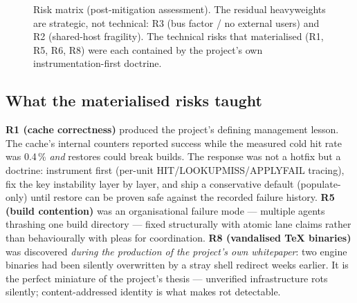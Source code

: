 \begin{figure}[h]
\centering
{}
\caption{Risk matrix (post-mitigation assessment). The residual heavyweights are strategic, not technical: R3 (bus factor / no external users) and R2 (shared-host fragility). The technical risks that materialised (R1, R5, R6, R8) were each contained by the project's own instrumentation-first doctrine.}
\label{fig:riskmatrix}
\end{figure}

\subsection{What the materialised risks taught}

\textbf{R1 (cache correctness)} produced the project's defining management lesson. The cache's internal counters reported success while the measured cold hit rate was 0.4\,\% \emph{and} restores could break builds. The response was not a hotfix but a doctrine: instrument first (per-unit HIT/LOOKUPMISS/APPLYFAIL tracing), fix the key instability layer by layer, and ship a conservative default (populate-only) until restore can be proven safe against the recorded failure history. \textbf{R5 (build contention)} was an organisational failure mode --- multiple agents thrashing one build directory --- fixed structurally with atomic lane claims rather than behaviourally with pleas for coordination. \textbf{R8 (vandalised TeX binaries)} was discovered \emph{during the production of the project's own whitepaper}: two engine binaries had been silently overwritten by a stray shell redirect weeks earlier. It is the perfect miniature of the project's thesis --- unverified infrastructure rots silently; content-addressed identity is what makes rot detectable.

